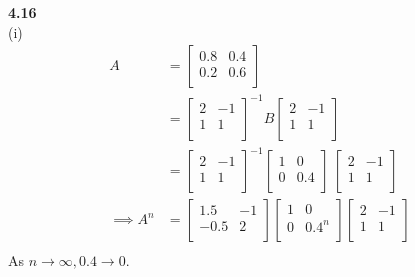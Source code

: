 \documentclass[letterpaper,12pt]{article}
\theoremstyle{definition}
\begin{document}
\noindent\textbf{4.16}\\
(i) \begin{align*}
A&=\begin{bmatrix}
	0.8 & 0.4\\
	0.2 & 0.6 \\
\end{bmatrix}\\
&= \begin{bmatrix}
	2 & -1 \\
	1 & 1 \\
\end{bmatrix}^{-1}
B \begin{bmatrix}
	2 & -1\\
	1 & 1 \\
\end{bmatrix}\\
&= \begin{bmatrix}
	2 & -1 \\
	1 & 1 \\
\end{bmatrix}^{-1}
 \begin{bmatrix}
	1 & 0\\
	0 & 0.4\\
\end{bmatrix} \ \begin{bmatrix}
	2 & -1\\
	1 & 1 \\
\end{bmatrix}\\
\implies A^n &= \begin{bmatrix}
	1.5 & -1 \\
	-0.5 & 2 \\
\end{bmatrix}
\begin{bmatrix}
	1 & 0\\
	0 & 0.4^n\\
\end{bmatrix} \begin{bmatrix}
	2 & -1\\
	1 & 1 \\
\end{bmatrix}\\
\end{align*}
As $n \rightarrow \infty, 0.4 \rightarrow 0$.
\end{document}
